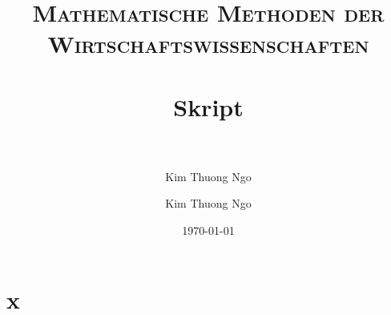 \documentclass[paper=a4, fontsize=11pt]{scrartcl}
\author{Kim Thuong Ngo}
\title{
\normalfont \normalsize
\textsc{Mathematische Methoden der Wirtschaftswissenschaften} \\ [25pt]
\horrule{0.5pt} \\[0.4cm]
\huge Skript \\
\horrule{2pt} \\[0.5cm]
}
\author{Kim Thuong Ngo}
\date{\normalsize\today}
\numberwithin{equation}{section}
\numberwithin{figure}{section}
\numberwithin{table}{section}
\begin{document}
\maketitle

\newpage

\tableofcontents


\newpage

\section{x}

\end{document}

